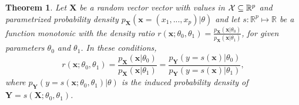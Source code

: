 \documentclass[12pt]{article}
\numberwithin{equation}{section}
\theoremstyle{plain}
\newtheorem{theorem}{Theorem}
\begin{document}
\begin{theorem}
    \label{thm:ratio-equivalence}
    Let $\mathbf{X}$ be a random vector vector with values in ${\cal X} \subseteq \mathbb{R}^p$ and parametrized probability
    density $p_{\mathbf{X}}(\mathbf{x} = (x_1, ..., x_p)|\theta)$ and let
    $s : \mathbb{R}^p \mapsto \mathbb{R}$ be a function monotonic with the density ratio
    $r(\mathbf{x};\theta_0,\theta_1) = \frac{p_\mathbf{X}(\mathbf{x}|\theta_0)}{p_\mathbf{X}(\mathbf{x}|\theta_1)}$,
    for given parameters $\theta_0$ and $\theta_1$. In these conditions,
    \begin{equation}
        r(\mathbf{x};\theta_0,\theta_1) = \frac{p_\mathbf{X}(\mathbf{x}|\theta_0)}{p_\mathbf{X}(\mathbf{x}|\theta_1)} = \frac{p_\mathbf{Y}(y=s(\mathbf{x})|\theta_0)}{p_\mathbf{Y}(y=s(\mathbf{x})|\theta_1)},
    \end{equation}
    where $p_\mathbf{Y}(y=s(\mathbf{x};\theta_0,\theta_1)|\theta)$ is the induced probability density of
    $\mathbf{Y} = s(\mathbf{X};\theta_0,\theta_1)$.
\end{theorem}
\end{document}
